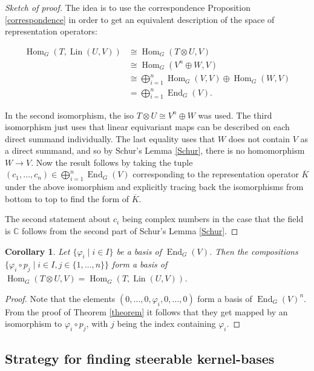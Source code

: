 \documentclass[12pt, a4paper]{article}
\theoremstyle{plain}
\newtheorem{cor}[pro]{Corollary}
\theoremstyle{definition}
\theoremstyle{remark}
\newcommand{\C}{\mathds{C}}
\DeclareMathOperator{\lin}{Lin}
\DeclareMathOperator{\End}{End}
\DeclareMathOperator{\Hom}{Hom}
\begin{document}
\begin{proof}[Sketch of proof]
The idea is to use the correspondence Proposition \ref{correspondence} in order to get an equivalent description of the space of representation operators:

\begin{align*}
\Hom_G(T, \lin(U, V)) & \cong \Hom_G(T \otimes U, V) \\
& \cong \Hom_G(V^n \oplus W, V) \\
& \cong \bigoplus_{i = 1}^{n} \Hom_G(V, V) \oplus \Hom_G(W, V) \\
& = \bigoplus_{i = 1}^{n} \End_G(V).
\end{align*}

In the second isomorphism, the iso $T \otimes U \cong V^n \oplus W$ was used. The third isomorphism just uses that linear equivariant maps can be described on each direct summand individually. The last equality uses that $W$ does not contain $V$ as a direct summand, and so by Schur's Lemma \ref{Schur}, there is no homomorphism $W \to V$. Now the result follows by taking the tuple $(c_1, \dots, c_n) \in \bigoplus_{i = 1}^{n} \End_G(V)$ corresponding to the representation operator $\overline{K}$ under the above isomorphism and explicitly tracing back the isomorphisms from bottom to top to find the form of $\overline{K}$.

The second statement about $c_i$ being complex numbers in the case that the field is $\C$ follows from the second part of Schur's Lemma \ref{Schur}.
\end{proof}

\begin{cor}\label{corollary}
Let $\{ \varphi_i \mid i \in I \}$ be a basis of $\End_G(V)$. Then the compositions $\{ \varphi_i \circ p_j \mid i \in I, j \in \{1, \dots, n\} \}$ form a basis of $\Hom_G(T \otimes U, V) = \Hom_G(T, \lin(U, V))$.
\end{cor}

\begin{proof}
Note that the elements $(0, \dots, 0, \varphi_i, 0, \dots, 0)$ form a basis of $\End_G(V)^n$. From the proof of Theorem \ref{theorem} it follows that they get mapped by an isomorphism to $\varphi_i \circ p_j$, with $j$ being the index containing $\varphi_i$.
\end{proof}



\subsection{Strategy for finding steerable kernel-bases}
\end{document}
